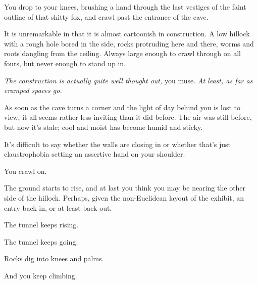 You drop to your knees, brushing a hand through the last vestiges of the faint outline of that shitty fox, and crawl past the entrance of the cave.

It is unremarkable in that it is almost cartoonish in construction. A low hillock with a rough hole bored in the side, rocks protruding here and there, worms and roots dangling from the ceiling. Always large enough to crawl through on all fours, but never enough to stand up in.

\emph{The construction is actually quite well thought out,} you muse. \emph{At least, as far as cramped spaces go.}


As soon as the cave turns a corner and the light of day behind you is lost to view, it all seems rather less inviting than it did before. The air was still before, but now it's stale; cool and moist has become humid and sticky.

It's difficult to say whether the walls are closing in or whether that's just claustrophobia setting an assertive hand on your shoulder.

You crawl on.

The ground starts to rise, and at last you think you may be nearing the other side of the hillock. Perhaps, given the non-Euclidean layout of the exhibit, an entry back in, or at least back out.

\vfill

\newpage

\null
\vfill

The tunnel keeps rising.

\newpage

\null
\vfill

The tunnel keeps going.

\vspace{1in}

\newpage

\null
\vfill

Rocks dig into knees and palms.

\null
\vspace{1.5in}

\newpage

\null
\vfill

And you keep climbing.

\null
\vspace{2in}

\newpage

\null
\vfill

